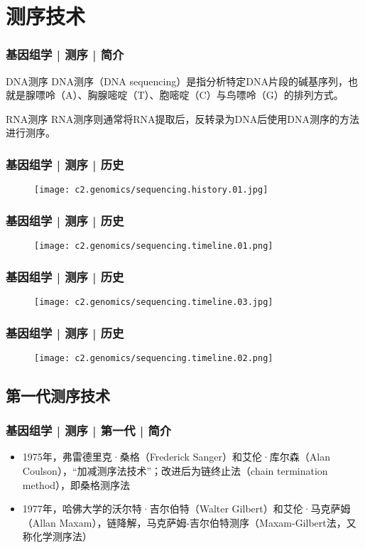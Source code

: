 \section{测序技术}
\begin{frame}
  \frametitle{基因组学 | 测序 | 简介}
  \begin{block}{DNA测序}
DNA测序（DNA sequencing）是指分析特定DNA片段的碱基序列，也就是腺嘌呤（A）、胸腺嘧啶（T）、胞嘧啶（C）与鸟嘌呤（G）的排列方式。
  \end{block}
  \pause
  \begin{block}{RNA测序}
RNA测序则通常将RNA提取后，反转录为DNA后使用DNA测序的方法进行测序。
  \end{block}
\end{frame}

\begin{frame}
  \frametitle{基因组学 | 测序 | 历史}
  \begin{figure}
    \centering
    \texttt{[image: c2.genomics/sequencing.history.01.jpg]}
  \end{figure}
\end{frame}

\begin{frame}
  \frametitle{基因组学 | 测序 | 历史}
  \begin{figure}
    \centering
    \texttt{[image: c2.genomics/sequencing.timeline.01.png]}
  \end{figure}
\end{frame}

\begin{frame}
  \frametitle{基因组学 | 测序 | 历史}
  \begin{figure}
    \centering
    \texttt{[image: c2.genomics/sequencing.timeline.03.jpg]}
  \end{figure}
\end{frame}

\begin{frame}
  \frametitle{基因组学 | 测序 | 历史}
  \begin{figure}
    \centering
    \texttt{[image: c2.genomics/sequencing.timeline.02.png]}
  \end{figure}
\end{frame}

\subsection{第一代测序技术}
\begin{frame}
  \frametitle{基因组学 | 测序 | 第一代 | 简介}
   \begin{itemize}
     \item 1975年，弗雷德里克·桑格（Frederick Sanger）和艾伦·库尔森（Alan Coulson），“加减测序法技术”；改进后为链终止法（chain termination method），即桑格测序法
     \item 1977年，哈佛大学的沃尔特·吉尔伯特（Walter Gilbert）和艾伦·马克萨姆（Allan Maxam），链降解，马克萨姆-吉尔伯特测序（Maxam-Gilbert法，又称化学测序法）
   \end{itemize} 
\end{frame}

